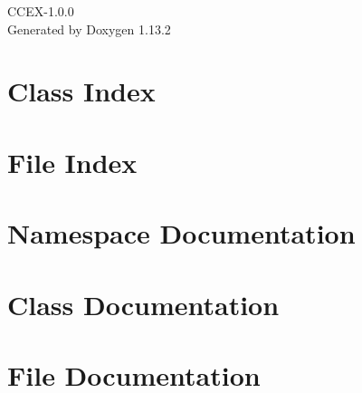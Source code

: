 \documentclass[twoside]{book}
\newcommand{\+}{\discretionary{\mbox{\scriptsize$\hookleftarrow$}}{}{}}
\newcommand{\clearemptydoublepage}{%
    \newpage{\pagestyle{empty}\cleardoublepage}%
  }
\begin{document}
  \raggedbottom
    \hypersetup{pageanchor=false,
                bookmarksnumbered=true,
                pdfencoding=unicode
               }
  \begin{titlepage}
  \vspace*{7cm}
  \begin{center}%
  {\Large CCEX-\/1.\+0.\+0}\\
  \vspace*{1cm}
  {\large Generated by Doxygen 1.13.2}\\
  \end{center}
  \end{titlepage}
  \clearemptydoublepage
  \tableofcontents
  \clearemptydoublepage
  \hypersetup{pageanchor=true}





\chapter{Class Index}

\chapter{File Index}

\chapter{Namespace Documentation}

\chapter{Class Documentation}

























\chapter{File Documentation}

















  \backmatter
  \newpage
  \clearemptydoublepage
  \printindex
\end{document}
